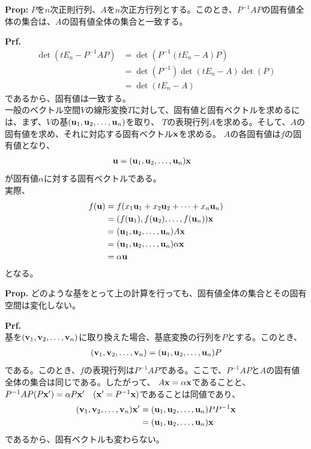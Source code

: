 \documentclass[a4paper,11pt]{jsarticle}
\numberwithin{equation}{section}
\begin{document}
\begin{itembox}[l]{\textbf{Prop:}}
  $P$を$n$次正則行列、$A$を$n$次正方行列とする。このとき、$P^{-1}AP$の固有値全体の集合は、$A$の固有値全体の集合と一致する。 
\end{itembox}
\textbf{Prf.}\\
\begin{align}
  \det(tE_n - P^{-1}AP) &= \det(P^{-1}(tE_n - A)P)\\
  &= \det(P^{-1})\det(tE_n - A)\det(P)\\
  &= \det(tE_n - A)
\end{align}
であるから、固有値は一致する。\hfill\qedsymbol\\
一般のベクトル空間$V$の線形変換$T$に対して、固有値と固有ベクトルを求めるには、まず、$V$の基$(\vb{u}_1, \vb{u}_2, \dots, \vb{u}_n)$を取り、
$T$の表現行列$A$を求める。そして、$A$の固有値を求め、それに対応する固有ベクトル$\vb{x}$を求める。
$A$の各固有値は$f$の固有値となり、
\begin{align}
  \vb{u} &= (\vb{u}_1, \vb{u}_2, \dots, \vb{u}_n) \vb{x} 
\end{align}
が固有値$\alpha$に対する固有ベクトルである。\\
実際、
\begin{align}
  f(\vb{u}) &= f(x_1\vb{u}_1 + x_2\vb{u}_2 + \dots + x_n\vb{u}_n)\\
  &=(f(\vb{u}_1), f(\vb{u}_2), \dots, f(\vb{u}_n))\vb{x}\\
  &=(\vb{u}_1, \vb{u}_2, \dots, \vb{u}_n)A\vb{x}\\
  &=(\vb{u}_1, \vb{u}_2, \dots, \vb{u}_n)\alpha\vb{x}\\
  &=\alpha\vb{u}
\end{align}
となる。\\

\begin{itembox}[l]{\textbf{Prop.}}
  どのような基をとって上の計算を行っても、固有値全体の集合とその固有空間は変化しない。
\end{itembox}
\textbf{Prf.}\\
基を$(\vb{v}_1, \vb{v}_2, \dots, \vb{v}_n)$に取り換えた場合、基底変換の行列を$P$とする。このとき、
\begin{align}
  (\vb{v}_1, \vb{v}_2, \dots, \vb{v}_n) = (\vb{u}_1, \vb{u}_2, \dots, \vb{u}_n)P
\end{align}
である。このとき、$f$の表現行列は$P^{-1}AP$である。ここで、$P^{-1}AP$と$A$の固有値全体の集合は同じである。したがって、
$A\vb{x} = \alpha\vb{x}$であることと、$P^{-1}AP(P\vb{x'}) = \alpha P\vb{x'}\quad (\vb{x'} = P^{-1}\vb{x})$であることは同値であり、
\begin{align}
  (\vb{v}_1, \vb{v}_2, \dots, \vb{v}_n) \vb{x'} &= (\vb{u}_1, \vb{u}_2, \dots, \vb{u}_n) PP^{-1}\vb{x} \\
  &= (\vb{u}_1, \vb{u}_2, \dots, \vb{u}_n) \vb{x}
\end{align}
であるから、固有ベクトルも変わらない。\hfill\qedsymbol\\
\end{document}
